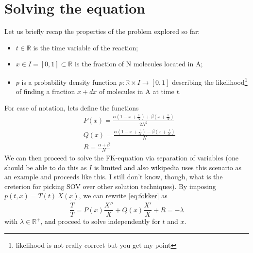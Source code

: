 \documentclass{article}
\newcommand{\red}[1]{{\color{red}#1}}
\begin{document}
	\section{Solving the equation}
	Let us briefly recap the properties of the problem explored so far:
	\begin{itemize}
		\item $t \in \mathbb{R}$ is the time variable of the reaction; \item $x
		\in I = [0,1] \subset \mathbb{R}$ is the fraction of N molecules located
		in A; 
		\item $p$ is a probability density function $p : \mathbb{R}\times
		I \rightarrow [0,1]$ describing the likelihood\footnote{likelihood is
		not really correct but you get my point} of finding a fraction
		$x+dx$ of molecules in A at time $t$.
	\end{itemize}
	For ease of notation, lets define the functions
	\begin{align*}
		&P(x) = \frac{\alpha \left(1-x+\frac{1}{N}\right) +
			\beta\left(x+\frac{1}{N}\right)}{2N^2}\\[6pt]
		&Q(x) = \frac{\alpha \left(1-x+\frac{1}{N}\right) -
			\beta\left(x+\frac{1}{N}\right)}{N} \\[6pt]
		&R = \frac{\alpha + \beta}{N}
	\end{align*}
	We can then proceed to solve the FK-equation via separation of variables
	\red{(one should be able to do this as $I$ is limited and also wikipedia
	uses this scenario as an example and proceeds like this. I still don't know,
	though,	what is the creterion for picking SOV over other solution
	techniques)}. By imposing $p(t,x) = T(t) \, X(x)$, we can rewrite
	\eqref{eq:fokker} as
	\begin{equation}
		\frac{\dot{T}}{T} = P(x) \frac{X''}{X} + Q(x)\frac{X'}{X} + R = -\lambda
	\end{equation}
	with $\lambda \in \mathbb{R}^+$, and proceed to solve independently for $t$ and $x$.
	
\end{document}

